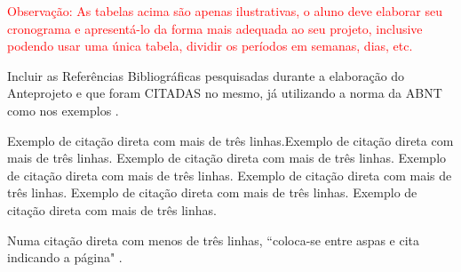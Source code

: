 \documentclass[font=plain]{abnt}
\begin{document}
\textcolor{red}{Observação: As tabelas acima são apenas ilustrativas, o aluno deve elaborar seu cronograma e apresentá-lo da forma mais adequada ao seu projeto, inclusive podendo usar uma única tabela, dividir os períodos em semanas, dias, etc.}

Incluir as Referências Bibliográficas pesquisadas durante a elaboração do Anteprojeto e que foram CITADAS no mesmo, já utilizando a norma da ABNT como nos exemplos\cite{exemplo1} \cite{exemplo2} \cite{exemplo3}.

\begin{citacao} Exemplo de citação direta com mais de três linhas.Exemplo de citação direta com mais de três linhas. Exemplo de citação direta com mais de três linhas. Exemplo de citação direta com mais de três linhas. Exemplo de citação direta com mais de três linhas. Exemplo de citação direta com mais de três linhas. Exemplo de citação direta com mais de três linhas\cite[p. 3]{exemplo1}.
\end{citacao}
Numa citação direta com menos de três linhas, ``coloca-se entre aspas e cita indicando a página" \cite[p. 2]{exemplo3}.



\end{document}
